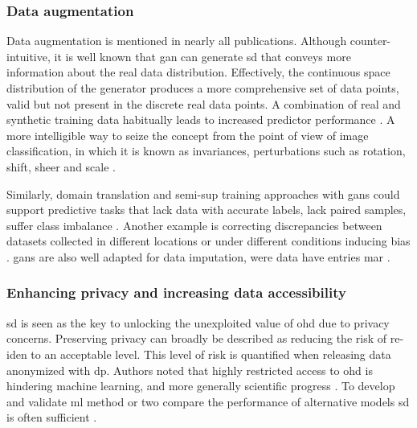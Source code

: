         \subsubsection{Data augmentation}\label{sec:augmentation}
    
            Data augmentation is mentioned in nearly all publications. Although counter-intuitive, it is well known that \gls{gan} can generate \gls{sd} that conveys more information about the real data distribution. Effectively, the continuous space distribution of the generator produces a more comprehensive set of data points, valid but not present in the discrete real data points. A combination of real and synthetic training data habitually leads to increased predictor performance \cite{Wang_2019,Che_2017,Yoon2018-ite, yoon2018imputation}. A more intelligible way to seize the concept from the point of view of image classification, in which it is known as invariances, perturbations such as rotation, shift, sheer and scale \cite{antoniou2017data}.\par 
            
            Similarly, domain translation and \gls{semi-sup} training approaches with \glspl{gan} could support predictive tasks that lack data with accurate labels, lack paired samples, suffer class imbalance \cite{Che_2017,mcdermott2018semi}. Another example is correcting discrepancies between datasets collected in different locations or under different conditions inducing bias \cite{Yoon2018-radial}. \glspl{gan} are also well adapted for data imputation, were data have entries \gls{mar} \cite{yoon2018imputation}. 

        \subsubsection{Enhancing privacy and increasing data accessibility}\label{sec:access_privacy}
    
            \gls{sd} is seen as the key to unlocking the unexploited value of \gls{ohd} due to privacy concerns. Preserving privacy can broadly be described as reducing the risk of \gls{re-iden} to an acceptable level. This level of risk is quantified when releasing data anonymized with \gls{dp}. Authors noted that highly restricted access to \gls{ohd} is hindering machine learning, and more generally scientific progress \cite{Beaulieu-Jones2019-ct, baowaly_2019_IEEE,baowaly_2019_jamia,Che_2017,esteban2017real,Fisher2019,severo2019ward2icu}. To develop and validate \gls{ml} method or two compare the performance of alternative models \gls{sd} is often sufficient \cite{Jordon2019}.\par
    
